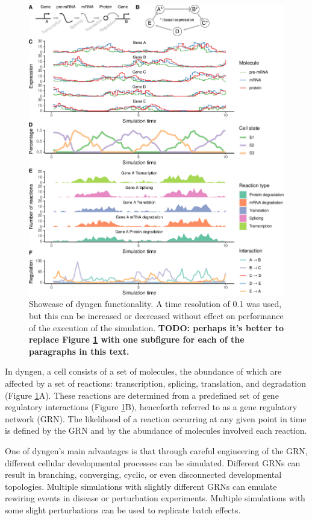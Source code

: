 \begin{figure}[htb!]
	\centering
	\includegraphics[width=\linewidth]{fig/simplecyclic_edited} 
	\caption{Showcase of dyngen functionality. A time resolution of 0.1 was used, but this can be increased or decreased without effect on performance of the execution of the simulation. \textbf{TODO: perhaps it's better to replace Figure \ref{fig:simplecyclic} with one subfigure for each of the paragraphs in this text.}}
	\label{fig:simplecyclic}
\end{figure}


In dyngen, a cell consists of a set of molecules, the abundance of which are affected by a set of reactions: transcription, splicing, translation, and degradation (Figure \ref{fig:simplecyclic}A). These reactions are determined from a predefined set of gene regulatory interactions (Figure \ref{fig:simplecyclic}B), henceforth referred to as a gene regulatory network (GRN). The likelihood of a reaction occurring at any given point in time is defined by the GRN and by the abundance of molecules involved each reaction.

One of dyngen's main advantages is that through careful engineering of the GRN, different cellular developmental processes can be simulated. Different GRNs can result in branching, converging, cyclic, or even disconnected developmental topologies. Multiple simulations with slightly different GRNs can emulate rewiring events in disease or perturbation experiments. 
Multiple simulations with some slight perturbations can be used to replicate batch effects. 

